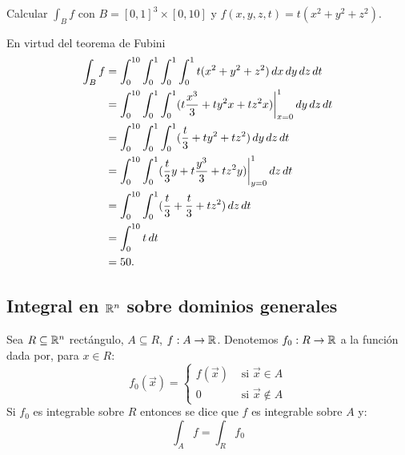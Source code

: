 \begin{demostracion}
%
\end{demostracion}

\begin{ejemplo}
Calcular $ \int_B f$ con $ B = [0,1]^3 \times [0, 10] $ y $f(x,y,z,t) = t(x^2+y^2+z^2) $.

\begin{solucion}
En virtud del teorema de Fubini
\begin{align*}
\int_B f
    &= \int_0^{10} \int_0^1 \int_0^1 \int_0^1 t(x^2+y^2+z^2) \, dx
    \, dy \, dz \, dt \\
    &= \int_0^{10} \int_0^1 \int_0^1
        (t \frac{x^3}{3} + t y^2 x + t z^2 x) \biggr |_{x=0}^1
        \, dy \, dz \, dt\\
    &= \int_0^{10} \int_0^1 \int_0^1
        (\frac{t}{3} + t y^2 + t z^2) \, dy \, dz \, dt\\
    &= \int_0^{10} \int_0^1 (\frac{t}{3} y + t \frac{y^3}{3} + t z^2 y)
        \biggr |_{y=0}^1 \, dz \, dt \\
    &= \int_0^{10} \int_0^1 (\frac{t}{3} + \frac{t}{3} + t z^2)
        \, dz \, dt \\
    &= \int_0^{10} t \, dt \\
    &= 50.
\end{align*}
\end{solucion}
\end{ejemplo}

\subsection{Integral en \texorpdfstring{$\mathbb{R}^n$}{Rn} sobre dominios generales }
\begin{definicion} \label{def:IntegralSobreDominioGeneralRN}
Sea $ R \subseteq \mathbb{R}^n $ rect\'angulo, $ A \subseteq R $, $f:A \to \mathbb{R} $. Denotemos $ f_0: R \to \mathbb{R} $ a la funci\'on dada por, para $ x \in R $:
\[
    f_0(\vec{x}) = \begin{cases}
        f(\vec{x}) & \text{ si } \vec{x} \in A \\
        0    & \text{ si } \vec{x} \notin A
    \end{cases}
\]
Si $ f_0 $ es integrable sobre $ R $ entonces se dice que $ f $ es integrable sobre $ A $ y:
    \[ \int_A f = \int_R f_0 \]
\end{definicion}

